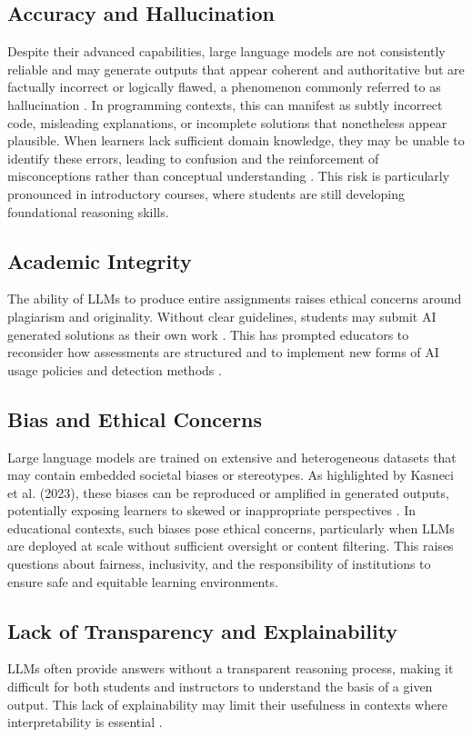 \documentclass[10pt,journal,compsoc]{IEEEtran}
\begin{document}
\subsection{Accuracy and Hallucination}
Despite their advanced capabilities, large language models are not consistently reliable and may generate outputs that appear coherent and authoritative but are factually incorrect or logically flawed, a phenomenon commonly referred to as hallucination \cite{Kasneci2023}. In programming contexts, this can manifest as subtly incorrect code, misleading explanations, or incomplete solutions that nonetheless appear plausible. When learners lack sufficient domain knowledge, they may be unable to identify these errors, leading to confusion and the reinforcement of misconceptions rather than conceptual understanding \cite{Deriba2023}. This risk is particularly pronounced in introductory courses, where students are still developing foundational reasoning skills.

\subsection{Academic Integrity}
The ability of LLMs to produce entire assignments raises ethical concerns around plagiarism and originality. Without clear guidelines, students may submit AI generated solutions as their own work \cite{10.1145/3641554.3701863}. This has prompted educators to reconsider how assessments are structured and to implement new forms of AI usage policies and detection methods \cite{Frankford2024}.

\subsection{Bias and Ethical Concerns}
Large language models are trained on extensive and heterogeneous datasets that may contain embedded societal biases or stereotypes. As highlighted by Kasneci et al. (2023), these biases can be reproduced or amplified in generated outputs, potentially exposing learners to skewed or inappropriate perspectives \cite{Kasneci2023}. In educational contexts, such biases pose ethical concerns, particularly when LLMs are deployed at scale without sufficient oversight or content filtering. This raises questions about fairness, inclusivity, and the responsibility of institutions to ensure safe and equitable learning environments.

\subsection{Lack of Transparency and Explainability}
LLMs often provide answers without a transparent reasoning process, making it difficult for both students and instructors to understand the basis of a given output. This lack of explainability may limit their usefulness in contexts where interpretability is essential \cite{wang2024largelanguagemodelseducation}.
\end{document}
